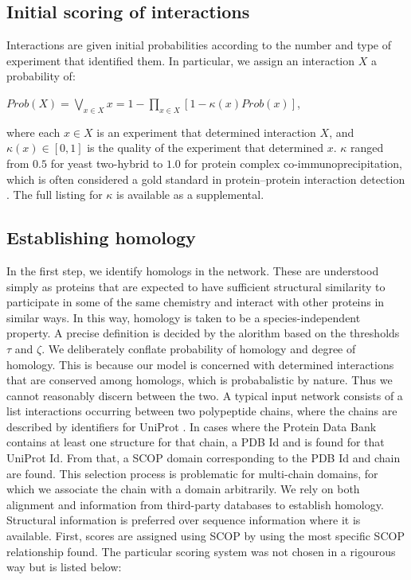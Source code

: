 \documentclass[12pt,twoside]{article}
\def\NI{\noindent}
\begin{document}
\subsection{Initial scoring of interactions}

\NI Interactions are given initial probabilities according to the number and type of experiment that identified them. In particular, we assign an interaction $X$ a probability of:

\NI $Prob(X) = \displaystyle \bigvee_{x \in X} x = 1 - \prod_{x \in X} \left[1 - \kappa(x) Prob(x) \right]$,

\NI where each $x \in X$ is an experiment that determined interaction $X$, and $\kappa(x) \in [0,1]$ is the quality of the experiment that determined $x$. $\kappa$ ranged from $0.5$ for yeast two-hybrid to $1.0$ for protein complex co-immunoprecipitation, which is often considered a gold standard in protein--protein interaction detection \cite{kaboord}. The full listing for $\kappa$ is available as a supplemental.

\subsection{Establishing homology}
\NI In the first step, we identify homologs in the network. These are understood simply as proteins that are expected to have sufficient structural similarity to participate in some of the same chemistry and interact with other proteins in similar ways. In this way, homology is taken to be a species-independent property. A precise definition is decided by the alorithm based on the thresholds $\tau$ and $\zeta$. We deliberately conflate probability of homology and degree of homology. This is because our model is concerned with determined interactions that are conserved among homologs, which is probabalistic by nature. Thus we cannot reasonably discern between the two.
\NI A typical input network consists of a list interactions occurring between two polypeptide chains, where the chains are described by identifiers for UniProt \cite{uniprot}. In cases where the Protein Data Bank \cite{pdb} contains at least one structure for that chain, a PDB Id and is found for that UniProt Id. From that, a SCOP \cite{scop} domain corresponding to the PDB Id and chain are found. This selection process is problematic for multi-chain domains, for which we associate the chain with a domain arbitrarily.
\NI We rely on both alignment and information from third-party databases to establish homology. Structural information is preferred over sequence information where it is available. First, scores are assigned using SCOP by using the most specific SCOP relationship found. The particular scoring system was not chosen in a rigourous way but is listed below:
\end{document}

